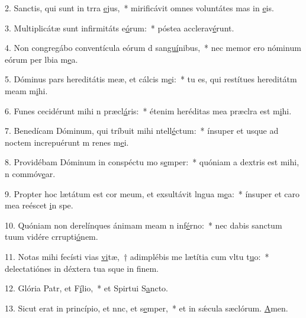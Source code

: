 2. Sanctis, qui sunt in trra \uline{e}jus,~* mirificávit omnes voluntátes mas in \uline{e}is.\par 
3. Multiplicátæ sunt infirmitáts e\uline{ó}rum:~* póstea acclerav\uline{é}runt.\par 
4. Non congregábo conventícula eórum d san\uline{guí}nibus,~* nec memor ero nóminum eórum per lbia m\uline{e}a.\par 
5. Dóminus pars hereditátis meæ, et cálcis m\uline{e}i:~* tu es, qui restítues hereditátm meam m\uline{i}hi.\par 
6. Funes cecidérunt mihi n præcl\uline{á}ris:~* étenim heréditas mea præclra est m\uline{i}hi.\par 
7. Benedícam Dóminum, qui tríbuit mihi ntell\uline{é}ctum:~* ínsuper et usque ad noctem increpuérunt m renes m\uline{e}i.\par 
8. Providébam Dóminum in conspéctu mo s\uline{e}mper:~* quóniam a dextris est mihi, n commóv\uline{e}ar.\par 
9. Propter hoc lætátum est cor meum, et exsultávit lngua m\uline{e}a:~* ínsuper et caro mea reéscet \uline{i}n spe.\par 
10. Quóniam non derelínques ánimam meam n inf\uline{é}rno:~* nec dabis sanctum tuum vidére crrupti\uline{ó}nem.\par 
11. Notas mihi fecísti vias \uline{vi}tæ,~† adimplébis me lætítia cum vltu t\uline{u}o:~* delectatiónes in déxtera tua sque in f\uline{i}nem.\par 
12. Glória Patr, et F\uline{í}lio,~* et Spirtui S\uline{a}ncto.\par 
13. Sicut erat in princípio, et nnc, et s\uline{e}mper,~* et in sǽcula sæclórum. \uline{A}men.\par 
